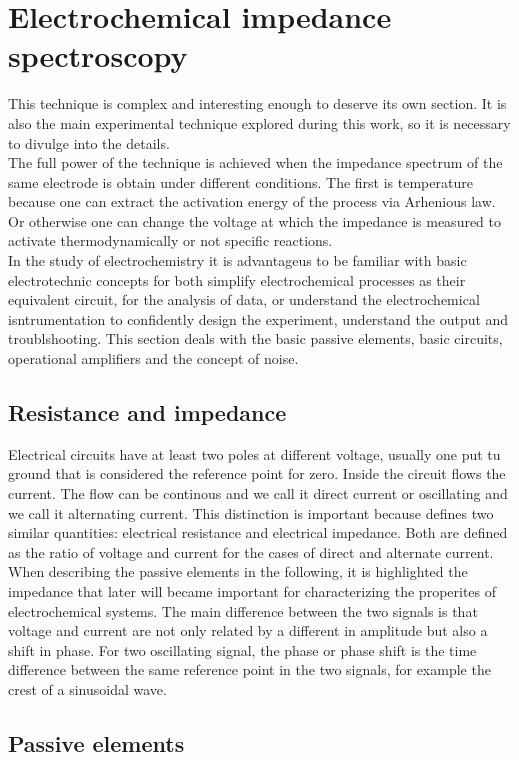 \section{Electrochemical impedance spectroscopy}
This technique is complex and interesting enough to deserve its own section. It is also the main experimental technique explored during this work, so it is necessary to divulge into the details.\\
The full power of the technique is achieved when the impedance spectrum of the same electrode is obtain under different conditions. The first is temperature because one can extract the activation energy of the process via Arhenious law. Or otherwise one can change the voltage at which the impedance is measured to activate thermodynamically or not specific reactions.\\
In the study of electrochemistry it is advantageus to be familiar with basic electrotechnic concepts for both simplify electrochemical processes as their equivalent circuit, for the analysis of data, or understand the electrochemical isntrumentation to confidently design the experiment, understand the output and troublshooting. This section deals with the basic passive elements, basic circuits, operational amplifiers and the concept of noise.
\subsection{Resistance and impedance}
Electrical circuits have at least two poles at different voltage, usually one put tu ground that is considered the reference point for zero. Inside the circuit flows the current. The flow can be continous and we call it direct current or oscillating and we call it alternating current. This distinction is important because defines two similar quantities: electrical resistance and electrical impedance. Both are defined as the ratio of voltage and current for the cases of direct and alternate current. When describing the passive elements in the following, it is highlighted the impedance that later will became important for characterizing the properites of electrochemical systems. The main difference between the two signals is that voltage and current are not only related by a different in amplitude but also a shift in phase. For two oscillating signal, the phase or phase shift is the time difference between the same reference point in the two signals, for example the crest of a sinusoidal wave.

\subsection{Passive elements}

